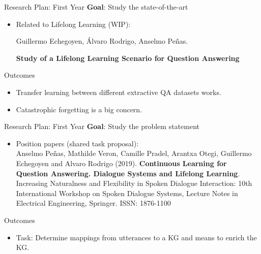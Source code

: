 \documentclass{beamer}
\begin{document}

\begin{frame}{Research Plan: First Year}
  \alert{\textbf{Goal}}: Study the state-of-the-art
  \vspace{0.2cm}
  \begin{itemize}
    \item Related to Lifelong Learning (WIP): \\
      {\small Guillermo Echegoyen, Álvaro Rodrigo, Anselmo Peñas.\par \textbf{Study of a Lifelong Learning Scenario for Question Answering}}
  \end{itemize}
  \begin{block}{Outcomes}
    \begin{itemize}
      \item Transfer learning between different extractive QA datasets works.
      \item Catastrophic forgetting is a big concern.
    \end{itemize}
  \end{block}
\end{frame}

\begin{frame}{Research Plan: First Year}
  \vspace{-0.4cm}
  \alert{\textbf{Goal}}: Study the problem statement
  \vspace{0.1cm}
  \begin{itemize}
    \item Position papers (shared task proposal): \\
      {\small Anselmo Peñas, Mathilde Veron, Camille Pradel, Arantxa Otegi, Guillermo Echegoyen and Alvaro Rodrigo (2019). \textbf{Continuous Learning for Question Answering. Dialogue Systems and Lifelong Learning}. Increasing Naturalness and Flexibility in Spoken Dialogue Interaction: 10th International Workshop on Spoken Dialogue Systems, Lecture Notes in Electrical Engineering, Springer. ISSN: 1876-1100 \cite{penas2019continuous}}
  \end{itemize}
  \begin{block}{Outcomes}
    \begin{itemize}
      \item Task: Determine mappings from utterances to a KG and means to enrich the KG.
    \end{itemize}
  \end{block}
\end{frame}
\end{document}
